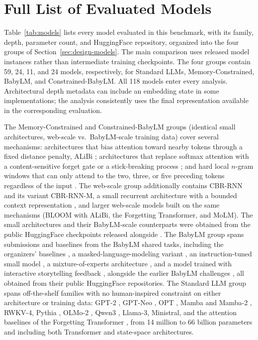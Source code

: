 \section{Full List of Evaluated Models}
\label{app:models}

Table~\ref{tab:models} lists every model evaluated in this benchmark, with its family, depth, parameter count, and HuggingFace repository, organized into the four groups of Section~\ref{sec:design-models}. The main comparison uses released model instances rather than intermediate training checkpoints. The four groups contain 59, 24, 11, and 24 models, respectively, for Standard LLMs, Memory-Constrained, BabyLM, and Constrained-BabyLM. All 118 models enter every analysis. Architectural depth metadata can include an embedding state in some implementations; the analysis consistently uses the final representation available in the corresponding evaluation.

The Memory-Constrained and Constrained-BabyLM groups (identical small architectures, web-scale vs.\ BabyLM-scale training data) cover several mechanisms: architectures that bias attention toward nearby tokens through a fixed distance penalty, ALiBi \citep{press2021train,devarda2024locally,clark2025linear}; architectures that replace softmax attention with a content-sensitive forget gate \citep{lin2025forgetting} or a stick-breaking process \citep{tan2025scaling}; and hard local $n$-gram windows that can only attend to the two, three, or five preceding tokens regardless of the input \citep{bu2026staticlinearattentionconstraints}. The web-scale group additionally contains CBR-RNN and its variant CBR-RNN-M, a small recurrent architecture with a bounded context representation \citep{timkey2023limited}, and larger web-scale models built on the same mechanisms (BLOOM with ALiBi, the Forgetting Transformer, and MoLM). The small architectures and their BabyLM-scale counterparts were obtained from the public HuggingFace checkpoints released alongside \citet{bu2026staticlinearattentionconstraints}. The BabyLM group spans submissions and baselines from the BabyLM shared tasks, including the organizers' baselines \citep{charpentier2025findings}, a masked-language-modeling variant \citep{edman2025mask}, an instruction-tuned small model \citep{capone2025classit}, a mixture-of-experts architecture \citep{tapaninaho2025moep}, and a model trained with interactive storytelling feedback \citep{martins2025upon}, alongside the earlier BabyLM challenges \citep{warstadt2023cfp,warstadt2023findings,hu2024secondbabylm}, all obtained from their public HuggingFace repositories. The Standard LLM group spans off-the-shelf families with no human-inspired constraint on either architecture or training data: GPT-2 \citep{radford2019gpt2}, GPT-Neo \citep{black2021gptneo}, OPT \citep{zhang2022opt}, Mamba and Mamba-2 \citep{gu2024mamba}, RWKV-4, Pythia \citep{biderman2023pythia}, OLMo-2 \citep{olmo20252olmo2furious}, Qwen3 \citep{qwen3}, Llama-3, Ministral, and the attention baselines of the Forgetting Transformer \citep{lin2025forgetting}, from 14 million to 66 billion parameters and including both Transformer and state-space architectures.

